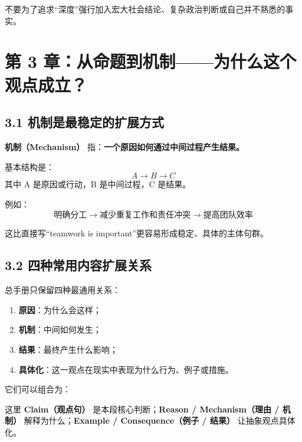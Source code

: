 \documentclass[11pt,a4paper]{ctexart}
\newcommand{\kw}[1]{\textbf{#1}}
\newcommand{\term}[2]{\textbf{#1（#2）}}
\begin{document}
不要为了追求“深度”强行加入宏大社会结论、复杂政治判断或自己并不熟悉的事实。

\section{第 3 章：从命题到机制——为什么这个观点成立？}

\subsection{3.1 机制是最稳定的扩展方式}
\term{机制}{Mechanism} 指：\kw{一个原因如何通过中间过程产生结果。}

基本结构是：
\[
\boxed{
A
\rightarrow
B
\rightarrow
C
}
\]
其中 A 是原因或行动，B 是中间过程，C 是结果。

例如：
\[
\text{明确分工}
\rightarrow
\text{减少重复工作和责任冲突}
\rightarrow
\text{提高团队效率}
\]

这比直接写“teamwork is important”更容易形成稳定、具体的主体句群。

\subsection{3.2 四种常用内容扩展关系}
总手册只保留四种最通用关系：
\begin{enumerate}
  \item \kw{原因}：为什么会这样；
  \item \kw{机制}：中间如何发生；
  \item \kw{结果}：最终产生什么影响；
  \item \kw{具体化}：这一观点在现实中表现为什么行为、例子或措施。
\end{enumerate}

它们可以组合为：
\begin{center}
\end{center}
这里 \term{Claim}{观点句} 是本段核心判断；\term{Reason / Mechanism}{理由 / 机制} 解释为什么；\term{Example / Consequence}{例子 / 结果} 让抽象观点具体化。
\end{document}
